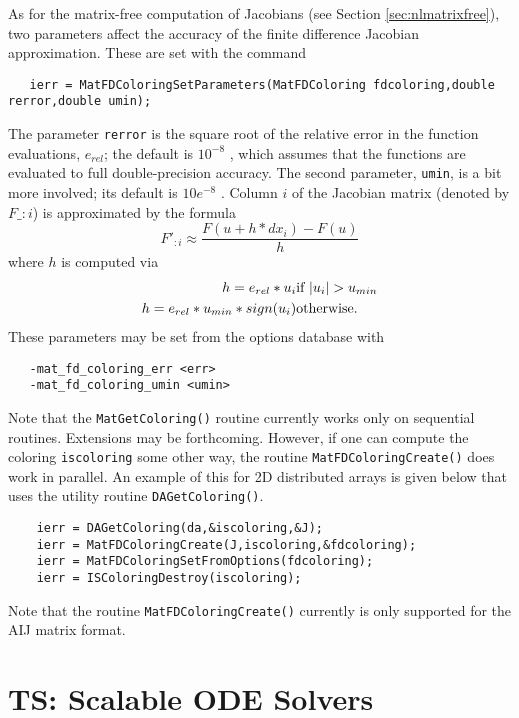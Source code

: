 As for the matrix-free computation of Jacobians (see Section
\ref{sec:nlmatrixfree}), two parameters affect the accuracy of the
finite difference Jacobian approximation.  These are set with the command
\begin{verbatim}
   ierr = MatFDColoringSetParameters(MatFDColoring fdcoloring,double rerror,double umin);
\end{verbatim}
The parameter {\tt rerror} is the square root of 
the relative error in the function evaluations, $e_{rel}$; the default is $ 10^{-8} $ , which assumes
that the functions are evaluated to full double-precision accuracy. The 
second parameter, {\tt umin}, is a bit more involved; its default is 
$ 10e^{-8} $ .  Column $i$ of the Jacobian matrix (denoted by $F\_{:i}$) is 
approximated by the formula
\[
    F'_{:i} \approx \frac{F(u + h*dx_{i}) - F(u)}{h}
\]
where $ h $ is computed via 
\begin{eqnarray*}
        h = e_{rel}*u_{i}             &    \hbox{if }  |u_{i}| > u_{min} \\
        h = e_{rel}*u_{min}*sign(u_{i})  &    \hbox{otherwise}.
\end{eqnarray*}
These parameters may be set from the options database with 
\begin{verbatim}
   -mat_fd_coloring_err <err>
   -mat_fd_coloring_umin <umin>
\end{verbatim}
 

Note that the {\tt MatGetColoring()} routine currently 
works only on sequential routines.  Extensions may be forthcoming. However,
if one can compute the coloring {\tt iscoloring} some other way, the routine
{\tt MatFDColoringCreate()} does work in parallel. An example of this for 
2D distributed arrays is given below that uses the utility routine
{\tt DAGetColoring()}. 

\begin{verbatim}
    ierr = DAGetColoring(da,&iscoloring,&J);
    ierr = MatFDColoringCreate(J,iscoloring,&fdcoloring); 
    ierr = MatFDColoringSetFromOptions(fdcoloring);
    ierr = ISColoringDestroy(iscoloring);
\end{verbatim}

Note that the routine {\tt MatFDColoringCreate()} currently is only 
supported for the AIJ matrix format.

\chapter{TS: Scalable ODE Solvers}

